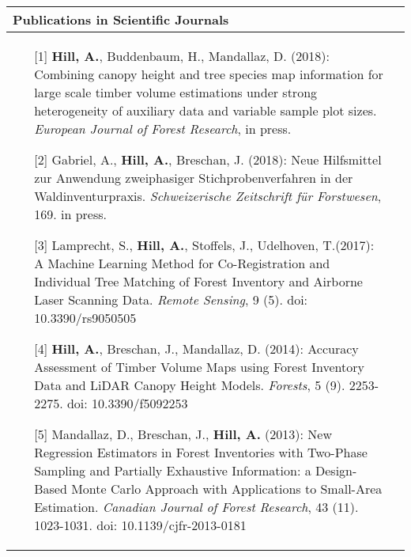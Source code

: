 \noindent
\begin{tabular*}{\textwidth}{p{}p{}}
	\multicolumn{2}{l}{\large Publications in Scientific Journals}\\
	\toprule
\begin{enumerate}[]
	
		\item [{[1]}] \textbf{Hill, A.}, Buddenbaum, H., Mandallaz, D. (2018): Combining canopy height and tree species map information for large scale timber volume estimations under strong heterogeneity of auxiliary data and variable sample plot sizes. \textit{European Journal of Forest Research}, in press.
	
	 	\item [{[2]}] Gabriel, A., \textbf{Hill, A.}, Breschan, J. (2018): Neue Hilfsmittel zur Anwendung zweiphasiger Stichprobenverfahren in der Waldinventurpraxis. \textit{Schweizerische Zeitschrift f{\"u}r Forstwesen}, 169. in press.
	
		\item [{[3]}] Lamprecht, S., \textbf{Hill, A.}, Stoffels, J., Udelhoven, T.(2017): A Machine Learning Method for Co-Registration and Individual Tree Matching of Forest Inventory and Airborne Laser Scanning Data. \textit{Remote Sensing}, 9 (5). doi: 10.3390/rs9050505
		
		\item [{[4]}] \textbf{Hill, A.}, Breschan, J., Mandallaz, D. (2014): Accuracy Assessment of Timber Volume Maps using Forest Inventory Data and LiDAR Canopy Height Models. \textit{Forests}, 5 (9). 2253-2275. doi: 10.3390/f5092253
			
		\item [{[5]}] Mandallaz, D., Breschan, J., \textbf{Hill, A.} (2013): New Regression Estimators in Forest Inventories with Two-Phase Sampling and Partially Exhaustive Information: a Design-Based Monte Carlo Approach with Applications to Small-Area Estimation. \textit{Canadian Journal of Forest Research}, 43 (11). 1023-1031. doi: 10.1139/cjfr-2013-0181
	
\end{enumerate}
	&\\
\end{tabular*}

